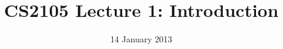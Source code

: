 \documentclass[20pt,xcolor={dvipsnames,svgnames,tables},notes=hide]{beamer}
\begin{document}
\title{CS2105 Lecture 1: Introduction}
\date{14 January 2013} 


\end{document}
